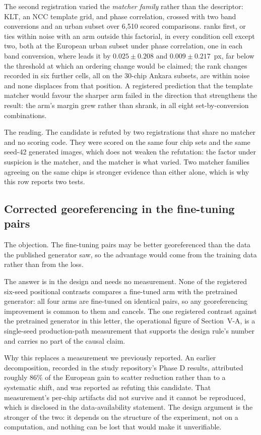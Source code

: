 The second registration varied the \emph{matcher family} rather than the descriptor: KLT,
an NCC template grid, and phase correlation, crossed with two band conversions and an
urban subset over 6,510 scored comparisons. \Lone{} ranks first, or ties within noise with
an arm outside this factorial, in every condition cell except two, both at the European
urban subset under phase correlation, one in each band conversion, where \advLone{}
leads it by $0.025 \pm 0.208$ and $0.009 \pm 0.217$~px, far below the threshold at which
an ordering change would be claimed; the rank changes recorded in six further cells, all
on the 30-chip Ankara subsets, are within noise and none displaces \Lone{} from that
position. A registered prediction that the template matcher would favour the
sharper arm failed in the direction that strengthens the result: the \Lone{}
arm's margin grew rather than shrank, in all eight set-by-conversion combinations.

The reading. The candidate is refuted by two registrations that share no matcher and no
scoring code. They were scored on the same four chip sets and the same seed-42 generated
images, which does not weaken the refutation: the factor under suspicion is the matcher,
and the matcher is what varied. Two matcher families agreeing on the same chips is stronger evidence than either alone,
which is why this row reports two tests.

\subsection{Corrected georeferencing in the fine-tuning pairs}

The objection. The fine-tuning pairs may be better georeferenced than the data
the published generator saw, so the advantage would come from the training data rather
than from the loss.

The answer is in the design and needs no measurement. None of the registered six-seed positional contrasts compares a fine-tuned arm with
the pretrained generator: all four arms are fine-tuned on identical pairs, so any
georeferencing improvement is common to them and cancels. The one registered contrast
against the pretrained generator in this letter, the operational figure of
Section~V-A, is a single-seed production-path measurement that supports the design
rule's number and carries no part of the causal claim.

Why this replaces a measurement we previously reported. An earlier decomposition,
recorded in the study repository's Phase D results, attributed roughly 86\% of the European gain to scatter reduction rather than to a
systematic shift, and was reported as refuting this candidate. That measurement's
per-chip artifacts did not survive and it cannot be reproduced, which is disclosed in the
data-availability statement. The design argument is the stronger of the two: it depends on the structure of the
experiment, not on a computation, and nothing can be lost that would make it unverifiable.

